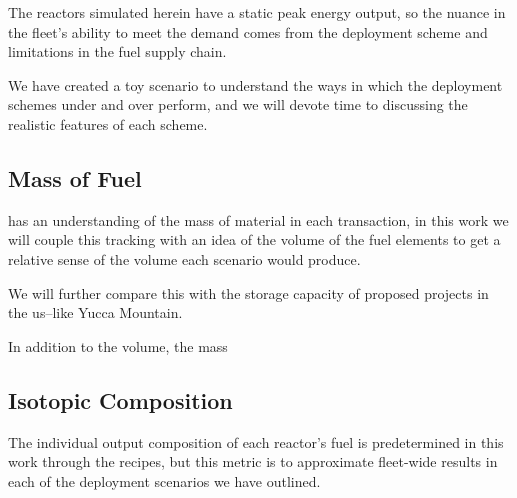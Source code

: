The reactors simulated herein have a static peak energy output, so the
nuance in the fleet's ability to meet the demand comes from the
deployment scheme and limitations in the fuel supply chain.

We have created a toy scenario to understand the ways in which the
deployment schemes under and over perform, and we will devote time to
discussing the realistic features of each scheme.


\subsection{Mass of Fuel}

\cyclus has an understanding of the mass of material in each
transaction, in this work we will couple this tracking with an idea of
the volume of the fuel elements to get a relative sense of the volume
each scenario would produce.

We will further compare this with the storage capacity of proposed
projects in the \gls{us}--like Yucca Mountain.

In addition to the volume, the mass %

\subsection{Isotopic Composition}

The individual output composition of each reactor's fuel is
predetermined in this work through the recipes, but this metric is to
approximate fleet-wide results in each of the deployment scenarios we
have outlined.